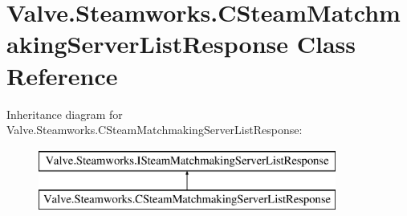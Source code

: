 \hypertarget{classValve_1_1Steamworks_1_1CSteamMatchmakingServerListResponse}{}\section{Valve.\+Steamworks.\+C\+Steam\+Matchmaking\+Server\+List\+Response Class Reference}
\label{classValve_1_1Steamworks_1_1CSteamMatchmakingServerListResponse}
Inheritance diagram for Valve.\+Steamworks.\+C\+Steam\+Matchmaking\+Server\+List\+Response\+:\begin{figure}[H]
\begin{center}
\leavevmode
\includegraphics[height=2.000000cm]{classValve_1_1Steamworks_1_1CSteamMatchmakingServerListResponse}
\end{center}
\end{figure}
